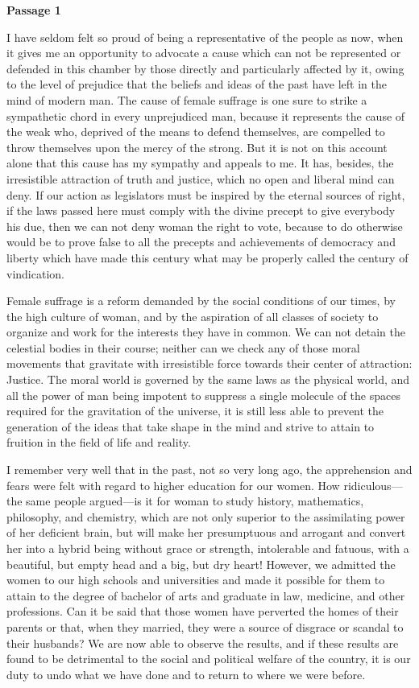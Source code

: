 \bigskip
\textbf{Passage 1}
\begin{linenumbers}
\modulolinenumbers[5]
\indent

\indent I have seldom felt so proud of being a representative of the people as now, when it gives me an opportunity to advocate a cause which can not be represented or defended in this chamber by those directly and particularly affected by it, owing to the level of prejudice that the beliefs and ideas of the past have left in the mind of modern man. The cause of female suffrage is one sure to strike a sympathetic chord in every unprejudiced man, because it represents the cause of the weak who, deprived of the means to defend themselves, are compelled to throw themselves upon the mercy of the strong. But it is not on this account alone that this cause has my sympathy and appeals to me. It has, besides, the irresistible attraction of truth and justice, which no open and liberal mind can deny. If our action as legislators must be inspired by the eternal sources of right, if the laws passed here must comply with the divine precept to give everybody his due, then we can not deny woman the right to vote, because to do otherwise would be to prove false to all the precepts and achievements of democracy and liberty which have made this century what may be properly called the century of vindication.

\indent Female suffrage is a reform demanded by the social conditions of our times, by the high culture of woman, and by the aspiration of all classes of society to organize and work for the interests they have in common. We can not detain the celestial bodies in their course; neither can we check any of those moral movements that gravitate with irresistible force towards their center of attraction: Justice. The moral world is governed by the same laws as the physical world, and all the power of man being impotent to suppress a single molecule of the spaces required for the gravitation of the universe, it is still less able to prevent the generation of the ideas that take shape in the mind and strive to attain to fruition in the field of life and reality.

\indent I remember very well that in the past, not so very long ago, the apprehension and fears were felt with regard to higher education for our women. How ridiculous—the same people argued—is it for woman to study history, mathematics, philosophy, and chemistry, which are not only superior to the assimilating power of her deficient brain, but will make her presumptuous and arrogant and convert her into a hybrid being without grace or strength, intolerable and fatuous, with a beautiful, but empty head and a big, but dry heart! However, we admitted the women to our high schools and universities and made it possible for them to attain to the degree of bachelor of arts and graduate in law, medicine, and other professions. Can it be said that those women have perverted the homes of their parents or that, when they married, they were a source of disgrace or scandal to their husbands? We are now able to observe the results, and if these results are found to be detrimental to the social and political welfare of the country, it is our duty to undo what we have done and to return to where we were before.


\end{linenumbers}
